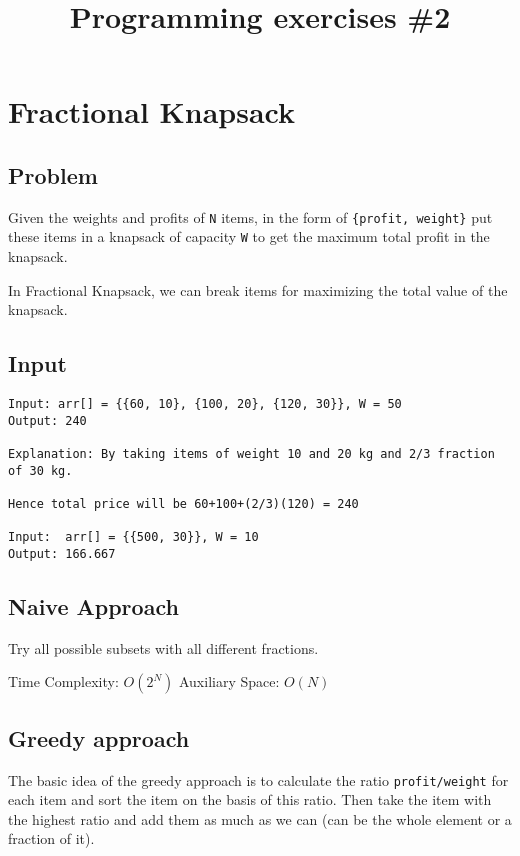 \documentclass[11pt]{article}
\date{}
\title{Programming exercises \#2}
\begin{document}
\maketitle
\setcounter{tocdepth}{1}
\tableofcontents



\section{Fractional Knapsack}
\label{sec:org3934e0f}
\subsection{Problem}
\label{sec:org4a143b4}
Given the weights and profits of \texttt{N} items, in the form of \texttt{\{profit, weight\}}
put these items in a knapsack of capacity \texttt{W} to get the maximum total profit in the knapsack.

In Fractional Knapsack, we can break items for maximizing the total value of the knapsack.

\subsection{Input}
\label{sec:org7af01b2}
\begin{verbatim}
Input: arr[] = {{60, 10}, {100, 20}, {120, 30}}, W = 50
Output: 240

Explanation: By taking items of weight 10 and 20 kg and 2/3 fraction of 30 kg.

Hence total price will be 60+100+(2/3)(120) = 240

Input:  arr[] = {{500, 30}}, W = 10
Output: 166.667
\end{verbatim}

\subsection{Naive Approach}
\label{sec:orgafa708a}
Try all possible subsets with all different fractions.

Time Complexity: \(O(2^N)\)
Auxiliary Space: \(O(N)\)

\subsection{Greedy approach}
\label{sec:org5d9c487}
The basic idea of the greedy approach is to calculate the ratio \texttt{profit/weight} for each item and sort the item on the basis of this ratio.
Then take the item with the highest ratio and add them as much as we can (can be the whole element or a fraction of it).
\end{document}
